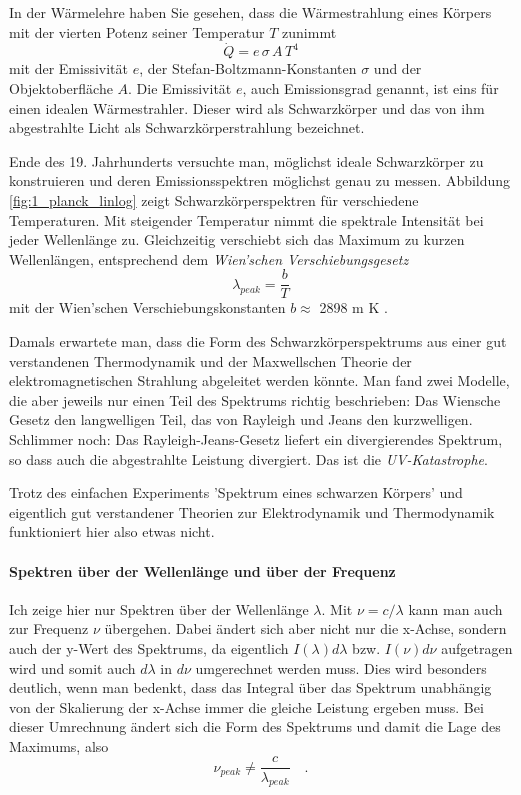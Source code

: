 In der Wärmelehre haben Sie gesehen, dass die Wärmestrahlung eines Körpers mit der vierten Potenz seiner Temperatur $T$ zunimmt
\begin{equation}
    \dot{Q} = e \, \sigma \, A \, T^4
\end{equation}
mit der Emissivität $e$, der Stefan-Boltzmann-Konstanten $\sigma$ und der Objektoberfläche $A$. Die Emissivität $e$, auch Emissionsgrad genannt, ist eins für einen idealen Wärmestrahler. Dieser wird als Schwarzkörper und das von ihm abgestrahlte Licht als Schwarzkörperstrahlung bezeichnet.

Ende des 19. Jahrhunderts versuchte man, möglichst ideale Schwarzkörper zu konstruieren und deren Emissionsspektren möglichst genau zu messen. Abbildung  \ref{fig:1_planck_linlog} zeigt Schwarzkörperspektren für verschiedene Temperaturen. Mit steigender Temperatur nimmt die spektrale Intensität bei jeder Wellenlänge zu. Gleichzeitig verschiebt sich das Maximum zu kurzen Wellenlängen, entsprechend dem \emph{Wien'schen Verschiebungsgesetz}
\begin{equation}
    \lambda_{peak} = \frac{b}{T}
\end{equation}
mit der Wien'schen Verschiebungskonstanten $b \approx $ 2898 \textmu m K .

Damals erwartete man, dass die Form des Schwarzkörperspektrums aus einer gut verstandenen Thermodynamik und der Maxwellschen Theorie der elektromagnetischen Strahlung abgeleitet werden könnte. Man fand zwei Modelle, die aber jeweils nur einen Teil des Spektrums richtig beschrieben: Das Wiensche Gesetz den langwelligen Teil, das von Rayleigh und Jeans den kurzwelligen. Schlimmer noch: Das Rayleigh-Jeans-Gesetz liefert ein divergierendes Spektrum, so dass auch die abgestrahlte Leistung divergiert. Das ist die \emph{UV-Katastrophe}.

Trotz des einfachen Experiments 'Spektrum eines schwarzen Körpers' und eigentlich gut verstandener Theorien zur Elektrodynamik und Thermodynamik funktioniert hier also etwas nicht.


\paragraph*{Spektren über der Wellenlänge und über der Frequenz} Ich zeige hier nur Spektren über der Wellenlänge $\lambda$. Mit $\nu = c / \lambda$ kann man auch zur Frequenz $\nu$ übergehen. Dabei ändert sich aber nicht nur die x-Achse, sondern auch der y-Wert des Spektrums, da eigentlich $I(\lambda) d\lambda$ bzw. $I(\nu) d\nu$ aufgetragen wird und somit auch $d\lambda$ in $d\nu$ umgerechnet werden muss. Dies wird besonders deutlich, wenn man bedenkt, dass das Integral über das Spektrum unabhängig von der Skalierung der x-Achse immer die gleiche Leistung ergeben muss. Bei dieser Umrechnung ändert sich die Form des Spektrums und damit die Lage des Maximums, also 
\begin{equation}
    \nu_{peak} \neq \frac{c}{\lambda_{peak}} \quad .
\end{equation}


